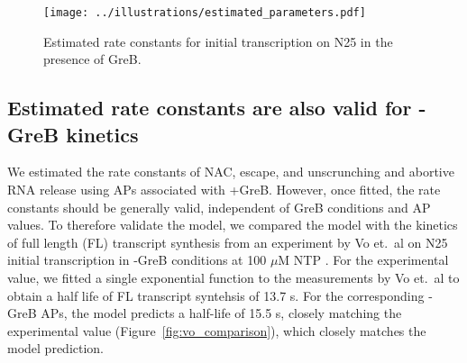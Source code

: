 \begin{figure}
	\begin{center}
      \texttt{[image: ../illustrations/estimated\_parameters.pdf]}
	\end{center}
    \caption{Estimated rate constants for initial transcription on N25 in the
      presence of GreB.}
    \label{fig:estimated_parameters}
\end{figure}

\subsection{Estimated rate constants are also valid for -GreB kinetics}
We estimated the rate constants of NAC, escape, and unscrunching and abortive
RNA release using APs associated with +GreB. However, once fitted, the rate
constants should be generally valid, independent of GreB conditions and AP
values. To therefore validate the model, we compared the model with the
kinetics of full length (FL) transcript synthesis from an experiment by Vo
et.\ al on N25 initial transcription in -GreB conditions at 100 $\mu$M NTP
\cite{vo_vitro_2003-1}. For the experimental value, we fitted a single
exponential function to the measurements by Vo et.\ al to obtain a half life
of FL transcript syntehsis of 13.7 s. For the corresponding -GreB APs, the
model predicts a half-life of 15.5 s, closely matching the experimental value
(Figure~\ref{fig:vo_comparison}), which closely matches the model prediction.


